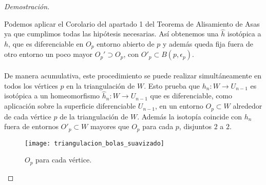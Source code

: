 \begin{proof}[Demostración]
\begin{enumerate}
\begin{figure}[h]
			\end{figure}
			Podemos aplicar el Corolario del apartado 1 del Teorema de Alisamiento de Asas ya que cumplimos todas las hipótesis necesarias. Así obtenemos una $\widehat{h}$ isotópica a $h$, que es diferenciable en $O_p$ entorno abierto de $p$ y además queda fija fuera de otro entorno un poco mayor $O_p'\supset O_p$, con $O'_p\subset B(p, \epsilon_p) $.\\
			\\ De manera acumulativa, este procedimiento se puede realizar simultáneamente en todos los vértices $p$ en la triangulación de $W$. Esto prueba que $h_n: W \rightarrow U_{n-1}$ es isotópica a un homeomorfismo $\widehat{h}_n: W \rightarrow U_{n-1}$ que es diferenciable, como aplicación sobre la superficie diferenciable $U_{n-1}$, en un entorno $O_p \subset W$ alrededor de cada vértice $p$ de la triangulación de $W$. Además la isotopía coincide con $h_n$ fuera de entornos $O'_p \subset W$ mayores que $O_p$ para cada $p$, disjuntos $2$ a $2$.\\
			\begin{figure}[h]
  				\centering
  				\texttt{[image: triangulacion\_bolas\_suavizado]}
  				\caption{$O_p$ para cada vértice.}
  				\label{fig:triangulacion_bolas_suavizado}
			\end{figure}


\end{enumerate}
\end{proof}
